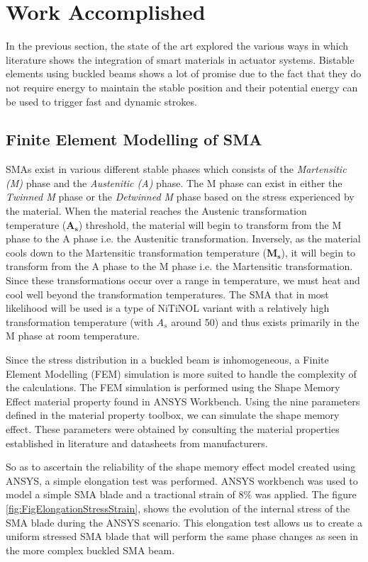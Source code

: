 \section{Work Accomplished}\label{sec:work_accomplished}
In the previous section, the state of the art explored the various ways in which literature shows the integration of smart materials in actuator systems. Bistable elements using buckled beams shows a lot of promise due to the fact that they do not require energy to maintain the stable position and their potential energy can be used to trigger fast and dynamic strokes.

\subsection{Finite Element Modelling of SMA}\label{ssec:WA_FEM}
SMAs exist in various different stable phases which consists of the \emph{Martensitic (M)} phase and the \emph{Austenitic (A)} phase. The M phase can exist in either the \emph{Twinned M} phase or the \emph{Detwinned M} phase based on the stress experienced by the material. When the material reaches the Austenic transformation temperature ($\mathbf{A_s}$) threshold, the material will begin to transform from the M phase to the A phase i.e. the Austenitic transformation. Inversely, as the material cools down to the Martensitic transformation temperature ($\mathbf{M_s}$), it will begin to transform from the A phase to the M phase i.e. the Martensitic transformation. Since these transformations occur over a range in temperature, we must heat and cool well beyond the transformation temperatures. The SMA that in most likelihood will be used is a type of NiTiNOL variant with a relatively high transformation temperature (with $A_s$ around 50\degreeC) and thus exists primarily in the M phase at room temperature.

Since the stress distribution in a buckled beam is inhomogeneous, a Finite Element Modelling (FEM) simulation is more suited to handle the complexity of the calculations. The FEM simulation is performed using the Shape Memory Effect material property found in ANSYS Workbench. Using the nine parameters defined in the material property toolbox, we can simulate the shape memory effect. These parameters were obtained by consulting the material properties established in literature and datasheets from manufacturers\cite{divringi_advanced_2009}.

 So as to ascertain the reliability of the shape memory effect model created using ANSYS, a simple elongation test was performed. ANSYS workbench was used to model a simple SMA blade and a tractional strain of 8$\%$ was applied. The figure \ref{fig:FigElongationStressStrain}, shows the evolution of the internal stress of the SMA blade during the ANSYS scenario. This elongation test allows us to create a uniform stressed SMA blade that will perform the same phase changes as seen in the more complex buckled SMA beam.

